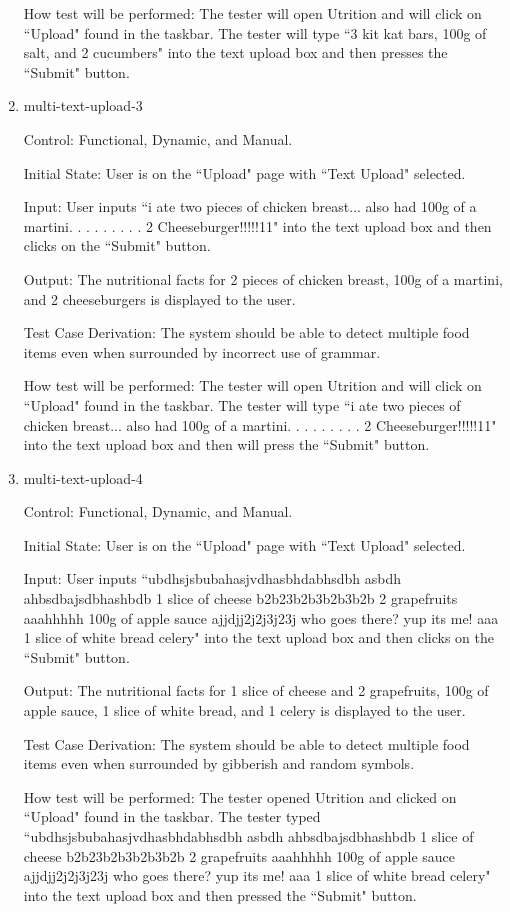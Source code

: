 \documentclass[12pt, titlepage]{article}
\begin{document}
\begin{enumerate}
	How test will be performed: The tester will open Utrition and will click on ``Upload" found in the taskbar. The tester will type ``3 kit kat bars, 100g of salt, and 2 cucumbers" into the text upload box and then presses the ``Submit" button.
	
	\item{multi-text-upload-3\\}
	
	Control: Functional, Dynamic, and Manual.
	
	Initial State: User is on the ``Upload" page with ``Text Upload" selected.
	
	Input: User inputs ``i ate two pieces of chicken breast... also had 100g of a martini. . . . . . . . . 2 Cheeseburger!!!!!11" into the text upload box and then clicks on the ``Submit" button.
	
	Output: The nutritional facts for 2 pieces of chicken breast, 100g of a martini, and 2 cheeseburgers is displayed to the user.
	
	Test Case Derivation: The system should be able to detect multiple food items even when surrounded by incorrect use of grammar.
	
	How test will be performed: The tester will open Utrition and will click on ``Upload" found in the taskbar. The tester will type ``i ate two pieces of chicken breast... also had 100g of a martini. . . . . . . . . 2 Cheeseburger!!!!!11" into the text upload box and then will press the ``Submit" button.
	
	\item{multi-text-upload-4\\}
	
	Control: Functional, Dynamic, and Manual.
	
	Initial State: User is on the ``Upload" page with ``Text Upload" selected.
	
	Input: User inputs ``ubdhsjsbubahasjvdhasbhdabhsdbh asbdh ahbsdbajsdbhashbdb 1 slice of cheese b2b23b2b3b2b3b2b 2 grapefruits aaahhhhh 100g of apple sauce ajjdjj2j2j3j23j who goes there? yup its me! aaa 1 slice of white bread celery" into the text upload box and then clicks on the ``Submit" button.
	
	Output: The nutritional facts for 1 slice of cheese and 2 grapefruits, 100g of apple sauce, 1 slice of white bread, and 1 celery is displayed to the user.
	
	Test Case Derivation: The system should be able to detect multiple food items even when surrounded by gibberish and random symbols.
	
	How test will be performed: The tester opened Utrition and clicked on ``Upload" found in the taskbar. The tester typed ``ubdhsjsbubahasjvdhasbhdabhsdbh asbdh ahbsdbajsdbhashbdb 1 slice of cheese b2b23b2b3b2b3b2b 2 grapefruits aaahhhhh 100g of apple sauce ajjdjj2j2j3j23j who goes there? yup its me! aaa 1 slice of white bread celery" into the text upload box and then pressed the ``Submit" button.

	\end{enumerate}
\end{document}
